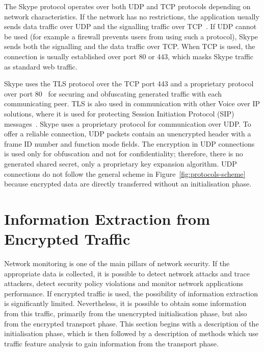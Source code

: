 The Skype protocol operates over both UDP and TCP protocols depending on network characteristics. If the network has no restrictions, the application usually sends data traffic over UDP and the signalling traffic over TCP~\cite{skype-hunter}. If UDP cannot be used (for example a firewall prevents users from using such a protocol), Skype sends both the signalling and the data traffic over TCP. When TCP is used, the connection is usually established over port 80 or 443, which masks Skype traffic as standard web traffic.

Skype uses the TLS protocol over the TCP port 443 and a proprietary protocol over port 80~\cite{skype-hunter} for securing and obfuscating generated traffic with each communicating peer. TLS is also used in communication with other Voice over IP solutions, where it is used for protecting Session Initiation Protocol (SIP) messages~\cite{skype-requirements}. Skype uses a proprietary protocol for communication over UDP. To offer a reliable connection, UDP packets contain an unencrypted header with a frame ID number and function mode fields. The encryption in UDP connections is used only for obfuscation and not for confidentiality; therefore, there is no generated shared secret, only a proprietary key expansion algorithm. UDP connections do not follow the general scheme in Figure~\ref{fig:protocols-scheme} because encrypted data are directly transferred without an initialisation phase.



\section{Information Extraction from Encrypted Traffic}\label{sec:extraction}


Network monitoring is one of the main pillars of network security. If the appropriate data is collected, it is possible to detect network attacks and trace attackers, detect security policy violations and monitor network applications performance. If encrypted traffic is used, the possibility of information extraction is significantly limited. Nevertheless, it is possible to obtain some information from this traffic, primarily from the unencrypted initialisation phase, but also from the encrypted transport phase. This section begins with a description of the initialisation phase, which is then followed by a description of methods which use traffic feature analysis to gain information from the transport phase.


